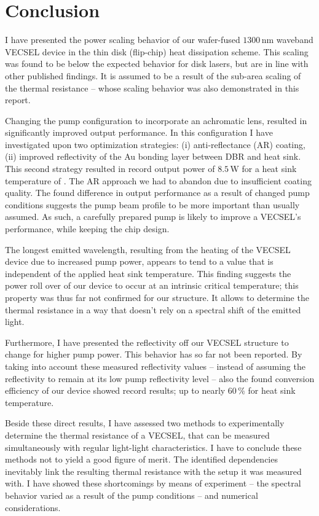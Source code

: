 \section{Conclusion}
\label{sec:conclusion}

I have presented
the power scaling behavior
of our wafer-fused
$1300\,\mathrm{nm}$ waveband
VECSEL device
in the thin disk (flip-chip)
heat dissipation scheme.
This scaling was found
to be below
the expected behavior
for disk lasers,
but are in line with
other published findings.
It is assumed
to be a result
of the sub-area scaling
of the thermal resistance --
whose scaling behavior
was also demonstrated
in this report.

Changing the pump configuration
to incorporate an achromatic lens,
resulted in significantly
improved output performance.
In this configuration
I have investigated
upon two optimization strategies:
(i) anti-reflectance (AR) coating,
(ii) improved reflectivity
of the Au bonding layer
between DBR and heat sink.
This second strategy
resulted in record output power
of $8.5\,\mathrm{W}$
for a heat sink temperature
of .
The AR approach we had to
abandon due to insufficient
coating quality.
The found difference
in output performance
as a result of
changed pump conditions
suggests the pump beam profile
to be more important
than usually assumed.
As such,
a carefully prepared pump
is likely to improve
a VECSEL's performance,
while keeping the chip design.

The longest emitted wavelength,
resulting from the heating
of the VECSEL device
due to increased pump power,
appears to tend to a value
that is independent of
the applied heat sink temperature.
This finding suggests
the power roll over
of our device
to occur at
an intrinsic critical temperature;
this property
was thus far not confirmed
for our structure.
It allows
to determine
the thermal resistance
in a way
that doesn't rely
on a spectral shift
of the emitted light.

Furthermore,
I have presented
the reflectivity
off our VECSEL structure
to change
for higher pump power.
This behavior
has so far not been reported.
By taking into account
these measured reflectivity values --
instead of assuming
the reflectivity
to remain at its low pump reflectivity level --
also the found conversion efficiency
of our device
showed record results;
up to nearly $60\,\%$ for
 heat sink temperature.

Beside these direct results,
I have assessed
two methods
to experimentally
determine the thermal resistance
of a VECSEL,
that can be measured
simultaneously with
regular light-light characteristics.
I have to conclude
these methods
not to yield
a good figure of merit.
The identified dependencies
inevitably link
the resulting thermal resistance
with the setup it was measured with.
I have showed these shortcomings
by means of
experiment --
the spectral behavior
varied as a result
of the pump conditions --
and numerical considerations.

